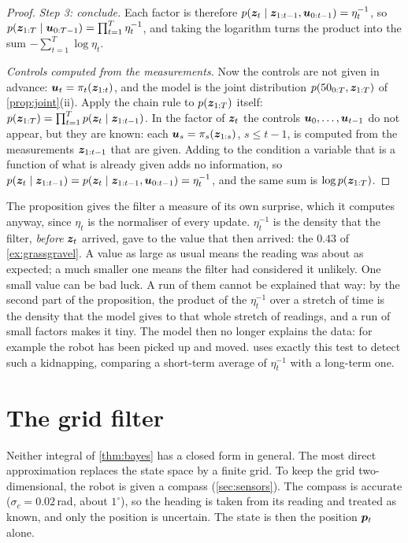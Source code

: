 \begin{proof}
\emph{Step 3: conclude.} Each factor is therefore
$p(\bm{z}_t\mid\bm{z}_{1:t-1},\bm{u}_{0:t-1})=\eta_t^{-1}$, so
$p(\bm{z}_{1:T}\mid\bm{u}_{0:T-1})=\prod_{t=1}^T\eta_t^{-1}$, and taking the
logarithm turns the product into the sum
$-\sum_{t=1}^T\log\eta_t$.

\emph{Controls computed from the measurements.} Now the controls are not
given in advance: $\bm{u}_t=\pi_t(\bm{z}_{1:t})$, and the model is the joint
distribution $p(50_{0:T},\bm{z}_{1:T})$ of \cref{prop:joint}(ii). Apply the
chain rule to $p(\bm{z}_{1:T})$ itself:
$p(\bm{z}_{1:T})=\prod_{t=1}^Tp(\bm{z}_t\mid\bm{z}_{1:t-1})$. In the factor of $\bm{z}_t$
the controls $\bm{u}_0,\dots,\bm{u}_{t-1}$ do not appear, but they are known:
each $\bm{u}_s=\pi_s(\bm{z}_{1:s})$, $s\le t-1$, is computed from the
measurements $\bm{z}_{1:t-1}$ that are given. Adding to the condition a
variable that is a function of what is already given adds no
information, so
$p(\bm{z}_t\mid\bm{z}_{1:t-1})=p(\bm{z}_t\mid\bm{z}_{1:t-1},\bm{u}_{0:t-1})=\eta_t^{-1}$,
and the same sum is $\log p(\bm{z}_{1:T})$.
\end{proof}

\begin{inwords}
The proposition gives the filter a measure of its own surprise, which it
computes anyway, since $\eta_t$ is the normaliser of every update.
$\eta_t^{-1}$ is the density that the filter, \emph{before} $\bm{z}_t$
arrived, gave to the value that then arrived: the $0.43$ of
\cref{ex:grassgravel}. A value as large as usual means the reading was
about as expected; a much smaller one means the filter had considered it
unlikely. One small value can be bad luck. A run of them cannot be
explained that way: by the second part of the proposition, the product of
the $\eta_t^{-1}$ over a stretch of time is the density that the model
gives to that whole stretch of readings, and a run of small factors makes
it tiny. The model then no longer explains the data: for example the
robot has been picked up and moved.  uses exactly this
test to detect such a kidnapping, comparing a short-term average of
$\eta_t^{-1}$ with a long-term one.
\end{inwords}

\section{The grid filter}
\label{sec:grid}

Neither integral of \cref{thm:bayes} has a closed form in general. The
most direct approximation replaces the state space by a finite grid. To
keep the grid two-dimensional, the robot is given a compass
(\cref{sec:sensors}). The compass is accurate ($\sigma_c=0.02$\,rad, about
$1^\circ$), so the heading is taken from its reading and treated as known,
and only the position is uncertain. The state is then the position
$\bm{p}_t$ alone.

